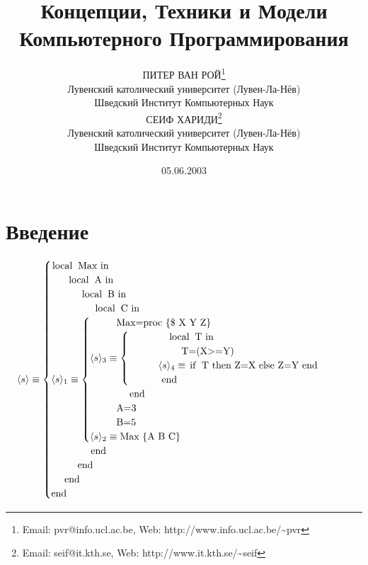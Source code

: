 \documentclass[a4paper, 12pt]{book}
\title{Концепции, Техники и Модели Компьютерного Программирования}
\date{05.06.2003}
\author{ПИТЕР ВАН РОЙ\thanks{Email: pvr@info.ucl.ac.be, Web: http://www.info.ucl.ac.be/\textasciitilde pvr}\\Лувенский католический университет (Лувен-Ла-Нёв)\\Шведский Институт Компьютерных Наук\\ СЕИФ ХАРИДИ\thanks{Email: seif@it.kth.se, Web: http://www.it.kth.se/\textasciitilde seif}\\Лувенский католический университет (Лувен-Ла-Нёв)\\Шведский Институт Компьютерных Наук}
\begin{document}

\lstset{language=Oz, mathescape=true, style=customoz}


\renewcommand {\contentsname} {Оглавление}
\renewcommand {\chaptername} {Глава}


{\let\newpage\relax\maketitle}
\maketitle
\tableofcontents




\part{Введение}


$$
\langle s \rangle \equiv \begin{cases}
  \text{\lstinline!local Max in!}\\
  \text{~~~~ \lstinline!local A in!}\\
  \text{~~~~~~~~ \lstinline!local B in!}\\
  \text{~~~~~~~~~~~~ \lstinline!local C in!}\\
  \langle s \rangle _1 \equiv \begin{cases}
    \text{~~~~~~~~\lstinline[mathescape=false]!Max=proc \{$ X Y Z\}!}\\
    \langle s \rangle _3 \equiv \begin{cases}
      \text{~~~~~~~~~~~~\lstinline!local T in!}\\
      \text{~~~~~~~~~~~~~~~~\lstinline!T=(X>=Y)!}\\
      \text{~~~~~~~~~} \langle s \rangle _4 \equiv \text{\lstinline!if T then Z=X else Z=Y end!}\\
      \text{~~~~~~~~~~\lstinline!end!}
    \end{cases}\\
    \text{~~~~~~~~~~~~\lstinline!end!}\\
    \text{~~~~~~~~\lstinline!A=3!}\\
    \text{~~~~~~~~\lstinline!B=5!}\\
    \langle s \rangle _2 \equiv \text{\lstinline!Max \{A B C\}!}\\
  \end{cases}\\
  \text{~~~~~~~~~~~~\lstinline!end!}\\
  \text{~~~~~~~~\lstinline!end!}\\
  \text{~~~~\lstinline!end!}\\
  \text{\lstinline!end!}
  \end{cases}
$$
\end{document}
